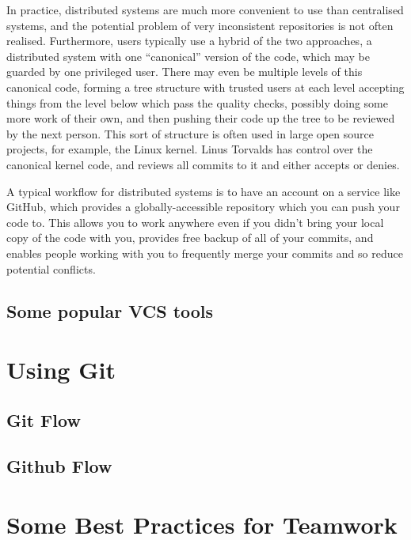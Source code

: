 \documentclass[12pt,a4paper]{article}
\begin{document}
In practice, distributed systems are much more convenient to use than
centralised systems, and the potential problem of very inconsistent
repositories is not often realised. Furthermore, users typically use a
hybrid of the two approaches, a distributed system with one
``canonical'' version of the code, which may be guarded by one
privileged user. There may even be multiple levels of this canonical
code, forming a tree structure with trusted users at each level
accepting things from the level below which pass the quality checks,
possibly doing some more work of their own, and then pushing their
code up the tree to be reviewed by the next person. This sort of
structure is often used in large open source projects, for example,
the Linux kernel. Linus Torvalds has control over the canonical kernel
code, and reviews all commits to it and either accepts or denies.

A typical workflow for distributed systems is to have an account on a
service like GitHub, which provides a globally-accessible repository
which you can push your code to. This allows you to work anywhere even
if you didn't bring your local copy of the code with you, provides
free backup of all of your commits, and enables people working with
you to frequently merge your commits and so reduce potential
conflicts.

\subsection{Some popular VCS tools}

\section{Using Git}

\subsection{Git Flow}

\subsection{Github Flow}

\section{Some Best Practices for Teamwork}
\end{document}
